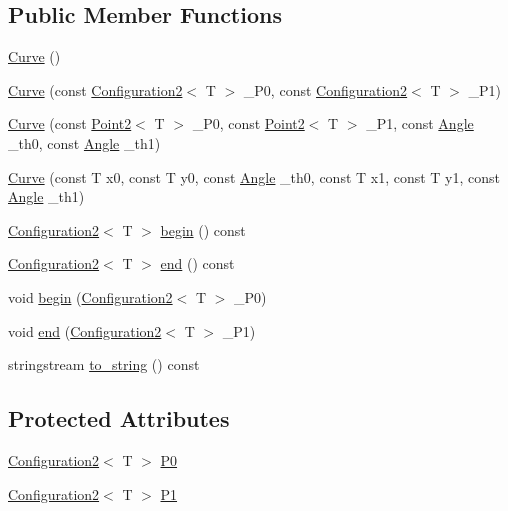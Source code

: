 \subsection*{Public Member Functions}
\begin{DoxyCompactItemize}
\item 
\mbox{\hyperlink{class_curve_a43ec90b53ea751c2df30ee3688af8a30}{Curve}} ()
\item 
\mbox{\hyperlink{class_curve_a5e4d06fa2e01878625e9f9c73f8d760b}{Curve}} (const \mbox{\hyperlink{class_configuration2}{Configuration2}}$<$ T $>$ \+\_\+\+P0, const \mbox{\hyperlink{class_configuration2}{Configuration2}}$<$ T $>$ \+\_\+\+P1)
\item 
\mbox{\hyperlink{class_curve_a8273498ecf9db747d2449fd0afc4702f}{Curve}} (const \mbox{\hyperlink{class_point2}{Point2}}$<$ T $>$ \+\_\+\+P0, const \mbox{\hyperlink{class_point2}{Point2}}$<$ T $>$ \+\_\+\+P1, const \mbox{\hyperlink{class_angle}{Angle}} \+\_\+th0, const \mbox{\hyperlink{class_angle}{Angle}} \+\_\+th1)
\item 
\mbox{\hyperlink{class_curve_a96b350c1818163ee7491f7474938a36d}{Curve}} (const T x0, const T y0, const \mbox{\hyperlink{class_angle}{Angle}} \+\_\+th0, const T x1, const T y1, const \mbox{\hyperlink{class_angle}{Angle}} \+\_\+th1)
\item 
\mbox{\hyperlink{class_configuration2}{Configuration2}}$<$ T $>$ \mbox{\hyperlink{class_curve_a5d0d409315773f72642e4323cb202711}{begin}} () const
\item 
\mbox{\hyperlink{class_configuration2}{Configuration2}}$<$ T $>$ \mbox{\hyperlink{class_curve_a08b72b1c8922c1132254d8f2b98fd78d}{end}} () const
\item 
void \mbox{\hyperlink{class_curve_a450ecb2eb0200c4f175ad5fc6afe4cb2}{begin}} (\mbox{\hyperlink{class_configuration2}{Configuration2}}$<$ T $>$ \+\_\+\+P0)
\item 
void \mbox{\hyperlink{class_curve_a5b11ffc442dcdca2def5d09ad4fbb424}{end}} (\mbox{\hyperlink{class_configuration2}{Configuration2}}$<$ T $>$ \+\_\+\+P1)
\item 
stringstream \mbox{\hyperlink{class_curve_a92e5b3a7445040e0e1e8a96707c5e6c2}{to\+\_\+string}} () const
\end{DoxyCompactItemize}
\subsection*{Protected Attributes}
\begin{DoxyCompactItemize}
\item 
\mbox{\hyperlink{class_configuration2}{Configuration2}}$<$ T $>$ \mbox{\hyperlink{class_curve_a3a549faa5e4b5990da5d5cf67940fe24}{P0}}
\item 
\mbox{\hyperlink{class_configuration2}{Configuration2}}$<$ T $>$ \mbox{\hyperlink{class_curve_ab9eb1cded523a8de01c4514a4bf9e748}{P1}}
\end{DoxyCompactItemize}
